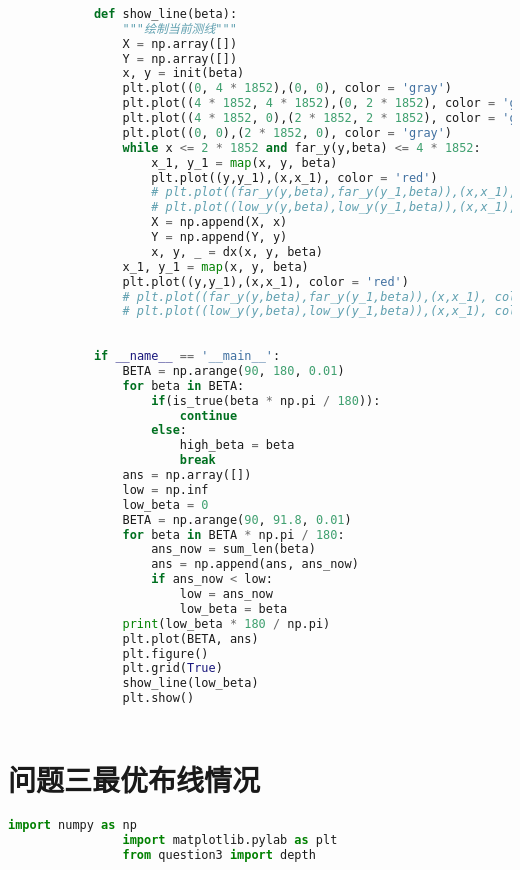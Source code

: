 \documentclass[withoutpreface,bwprint]{cumcmthesis} %
\begin{document}
\begin{appendices}
\begin{lstlisting}[language=python]
            
            def show_line(beta):
                """绘制当前测线"""
                X = np.array([])
                Y = np.array([])
                x, y = init(beta)
                plt.plot((0, 4 * 1852),(0, 0), color = 'gray')
                plt.plot((4 * 1852, 4 * 1852),(0, 2 * 1852), color = 'gray')
                plt.plot((4 * 1852, 0),(2 * 1852, 2 * 1852), color = 'gray')
                plt.plot((0, 0),(2 * 1852, 0), color = 'gray')
                while x <= 2 * 1852 and far_y(y,beta) <= 4 * 1852:
                    x_1, y_1 = map(x, y, beta)
                    plt.plot((y,y_1),(x,x_1), color = 'red')
                    # plt.plot((far_y(y,beta),far_y(y_1,beta)),(x,x_1), color = 'blue')
                    # plt.plot((low_y(y,beta),low_y(y_1,beta)),(x,x_1), color = 'green')
                    X = np.append(X, x)
                    Y = np.append(Y, y)
                    x, y, _ = dx(x, y, beta)
                x_1, y_1 = map(x, y, beta)
                plt.plot((y,y_1),(x,x_1), color = 'red')
                # plt.plot((far_y(y,beta),far_y(y_1,beta)),(x,x_1), color = 'blue')
                # plt.plot((low_y(y,beta),low_y(y_1,beta)),(x,x_1), color = 'green')
            
            
            if __name__ == '__main__':
                BETA = np.arange(90, 180, 0.01)
                for beta in BETA:
                    if(is_true(beta * np.pi / 180)):
                        continue
                    else:
                        high_beta = beta
                        break
                ans = np.array([])
                low = np.inf
                low_beta = 0
                BETA = np.arange(90, 91.8, 0.01)
                for beta in BETA * np.pi / 180:
                    ans_now = sum_len(beta)
                    ans = np.append(ans, ans_now)
                    if ans_now < low:
                        low = ans_now
                        low_beta = beta
                print(low_beta * 180 / np.pi)
                plt.plot(BETA, ans)
                plt.figure()
                plt.grid(True)
                show_line(low_beta)
                plt.show()
                
            \end{lstlisting}

            \section{问题三最优布线情况}
            \begin{lstlisting}[language=python]
                import numpy as np
                import matplotlib.pylab as plt
                from question3 import depth
                

\end{lstlisting}
\end{appendices}
\end{document}
